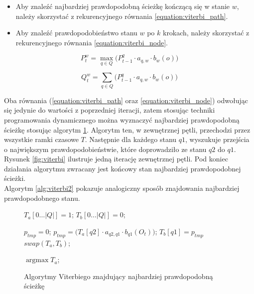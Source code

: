 \documentclass[shortabstract, mgr]{iithesis}
\DeclareMathOperator*{\argmax}{\arg\max}   %
\begin{document}
		   \begin{itemize}
			   	\item Aby znaleźć najbardziej prawdopodobną ścieżkę kończącą się w stanie $w$, należy skorzystać z rekurencyjnego równania \ref{equation:viterbi_path}.
			   	\item Aby znaleźć prawdopodobieństwo stanu $w$ po $k$ krokach, należy skorzystać z rekurencyjnego równania \ref{equation:viterbi_node}.
		   \end{itemize}
	   	   
		   \begin{equation}
		   P_t^w=\max_{q \in Q} \bigg( P_{t-1}^q\cdot a_{q,w}\cdot b_w(o) \bigg)
		   \label{equation:viterbi_path}
		   \end{equation}
		   
		   \begin{equation}
		   Q_t^w=\sum_{q \in Q} \bigg( P_{t-1}^q\cdot a_{q,w}\cdot b_w(o) \bigg)
		   \label{equation:viterbi_node}
		   \end{equation}
		   
		  Oba równania (\ref{equation:viterbi_path} oraz \ref{equation:viterbi_node}) odwołując się jedynie do wartości z poprzedniej iteracji, zatem stosując techniki programowania dynamicznego można wyznaczyć najbardziej prawdopodobną ścieżkę stosując algorytm \ref{alg:viterbi}. Algorytm ten, w zewnętrznej pętli, przechodzi przez wszystkie ramki czasowe $T$. Następnie dla każdego stanu $q1$, wyszukuje przejścia o największym prawdopodobieństwie, które doprowadziło ze stanu $q2$ do $q1$. Rysunek \ref{fig:viterbi} ilustruje jedną iterację zewnętrznej pętli. Pod koniec działania algorytmu zwracany jest końcowy stan najbardziej prawdopodobnej ścieżki. \\
		  Algorytm \ref{alg:viterbi2} pokazuje analogiczny sposób znajdowania najbardziej prawdopodobnego stanu.
		
		  \begin{figure}
			   \begin{algorithmic}[1]
				   	
					   	
					   	\STATE $T_a[0 \ldots |Q|] = 1$;
					   	\STATE $T_b[0 \ldots |Q|] = 0$;
					   	
							   	\STATE $p_{tmp} = 0$;
									   	\STATE $p_{tmp} = \bigg( T_a[q2]\cdot a_{q2,q1}\cdot b_{q1}(O_t) \bigg)$;
								   	\ENDIF
							   	\ENDFOR
							   	\STATE $T_b[q1] = p_{tmp}$
						   	\ENDFOR
						   	\STATE $swap(T_a, T_b)$;
					   	\ENDFOR
					   	
					   	\RETURN $\argmax{T_a}$;
			   \end{algorithmic}
		  \caption{Algorytmy Viterbiego znajdujący najbardziej prawdopodobną ścieżkę}
		  \label{alg:viterbi}
		  \end{figure}		
	  
\end{document}
